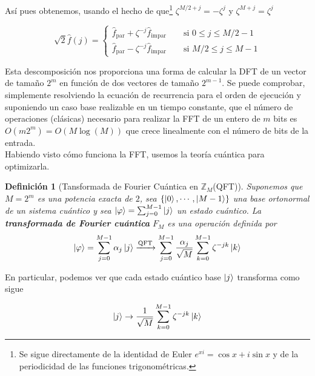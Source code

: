 \documentclass[11pt, spanish]{report}
\numberwithin{equation}{section}
\newtheorem{defin}{Definición}[section]
\numberwithin{defin}{section}
\newenvironment{yellowBox}{\begin{tcolorbox}[colback=yellow!5!white,colframe=yellow!75!black]}{\end{tcolorbox}}
\begin{document}
Así pues obtenemos, usando el hecho de que\footnote{Se sigue directamente de la identidad de Euler $e^{xi}=\cos x + i\sin x$ y de la periodicidad de las funciones trigonométricas.} $\zeta^{M/2+j}=-\zeta^j$ y $\zeta^{M+j}=\zeta^j$

\begin{equation}
\sqrt{2}\hat{f}(j)=\begin{cases}
	\hat{f}_{\text{par}}+\zeta^{-j}\hat{f}_{\text{impar}}\qquad \text{si } 0\leq j\leq M/2-1\\
	\hat{f}_{\text{par}}-\zeta^{-j}\hat{f}_{\text{impar}}\qquad \text{si } M/2\leq j\leq M-1
\end{cases}
\end{equation}

Esta descomposición nos proporciona una forma de calcular la DFT de un vector de tamaño $2^m$ en función de dos vectores de tamaño $2^{m-1}$. Se puede comprobar, simplemente resolviendo la ecuación de recurrencia para el orden de ejecución y suponiendo un caso base realizable en un tiempo constante, que el número de operaciones (clásicas) necesario para realizar la FFT de un entero de $m$ bits es $O(m2^m)=O(M\log(M))$ que crece linealmente con el número de bits de la entrada.\\

Habiendo visto cómo funciona la FFT, usemos la teoría cuántica para optimizarla.\\


\begin{yellowBox}
\begin{defin}[Tansformada de Fourier Cuántica en $\mathbb{Z}_M$(QFT)] Suponemos que $M=2^m$ es una potencia exacta de $2$, sea $\{\ket{0},\cdots,\ket{M-1}\}$ una base ortonormal de un sistema cuántico y sea $\ket{\varphi}=\sum_{j=0}^{M-1}\ket{j}$ un estado cuántico. La \textbf{transformada de Fourier cuántica} $F_M$ es una operación definida por
\begin{equation}
\ket{\varphi}=\sum_{j=0}^{M-1}\alpha_j\ket{j}\xrightarrow[]{\text{QFT}} \sum_{j=0}^{M-1}\frac{\alpha_j}{\sqrt{M}}\sum_{k=0}^{M-1}\zeta^{-jk}\ket{k}
\end{equation}
\end{defin}
\end{yellowBox}

En particular, podemos ver que cada estado cuántico base $\ket{j}$ transforma como sigue\footnotemark{}

\begin{equation}
\ket{j}\rightarrow\frac{1}{\sqrt{M}}\sum_{k=0}^{M-1}\zeta^{-jk}\ket{k}
\end{equation}
\end{document}

